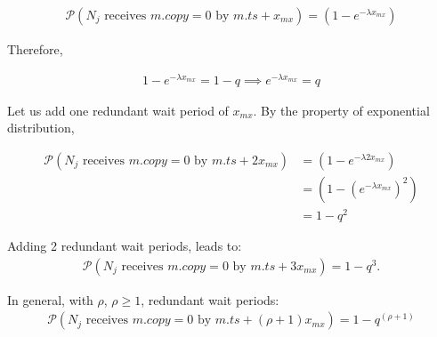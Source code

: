         \begin{equation}
            \begin{aligned}
                \mathcal{P}(N_j\text{ receives } m.copy = 0 \text{ by } m.ts + x_{mx})  = \left(1 - e^{-\lambda x_{mx}}\right)
            \end{aligned}
        \end{equation}
        
        Therefore,
        
        \begin{equation}
            \label{eq:1_minus_q}
            \begin{aligned}
                1 - e^{-\lambda x_{mx}} = 1 - q \implies e^{-\lambda x_{mx}} = q
            \end{aligned}
        \end{equation}
        
        Let us add one redundant wait period of $x_{mx}$.  By the property of exponential distribution,
        
        \begin{equation}
            \begin{split}
                \mathcal{P}(N_j\text{ receives } m.copy = 0 \text{ by } m.ts + 2x_{mx})  &= \left(1 - e^{-\lambda 2 x_{mx}} \right) \\
                &= \left(1 - \left(e^{-\lambda x_{mx}} \right)^2\right) \\
                &= 1 - q^2
            \end{split}
        \end{equation}
        
        Adding 2 redundant wait periods, leads to: 
         \begin{equation}
            \begin{aligned}
                \mathcal{P}(N_j\text{ receives } m.copy = 0 \text{ by } m.ts + 3x_{mx})  = 1 - q^3.
            \end{aligned}
        \end{equation}
        
        In general, with $\rho$, $\rho \geq 1$, redundant wait periods:
        \begin{equation}
            \begin{aligned}
                \mathcal{P}(N_j\text{ receives } m.copy = 0 \text{ by } m.ts + (\rho + 1) x_{mx})  = 1 - q^{(\rho+1)}
            \end{aligned}
        \end{equation}
        
